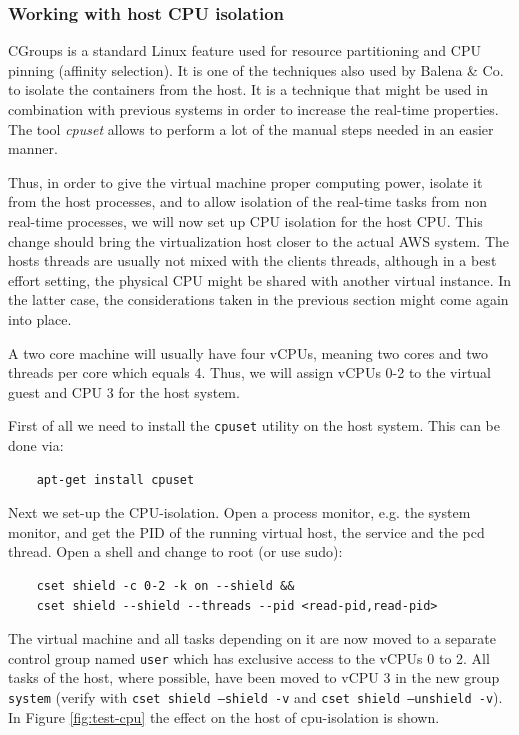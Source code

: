 \documentclass[]{scrartcl}
\begin{document}
\subsubsection{Working with host CPU isolation}

CGroups is a standard Linux feature used for resource partitioning and CPU pinning (affinity selection). It is one of the techniques also used by Balena \& Co. to isolate the containers from the host. It is a technique that might be used in combination with previous systems in order to increase the real-time properties. The tool \textit{cpuset} allows to perform a lot of the manual steps needed in an easier manner. 

Thus, in order to give the virtual machine proper computing power, isolate it from the host processes, and to allow isolation of the real-time tasks from non real-time processes, we will now set up CPU isolation for the host CPU.
This change should bring the virtualization host closer to the actual AWS system. The hosts threads are usually not mixed with the clients threads, although in a best effort setting, the physical CPU might be shared with another virtual instance. In the latter case, the considerations taken in the previous section might come again into place.

A two core machine will usually have four vCPUs, meaning two cores and two threads per core which equals 4. Thus, we will assign vCPUs 0-2 to the virtual guest and CPU 3 for the host system.

First of all we need to install the \texttt{cpuset} utility on the host system. This can be done via:

\begin{verbatim}
	apt-get install cpuset
\end{verbatim}

Next we set-up the CPU-isolation. Open a process monitor, e.g. the system monitor, and get the PID of the running virtual host, the service and the pcd thread. Open a shell and change to root (or use sudo):

\begin{verbatim}
	cset shield -c 0-2 -k on --shield &&
	cset shield --shield --threads --pid <read-pid,read-pid>
\end{verbatim}

The virtual machine and all tasks depending on it are now moved to a separate control group named \texttt{user} which has exclusive access to the vCPUs 0 to 2. All tasks of the host, where possible, have been moved to vCPU 3 in the new group \texttt{system} (verify with \texttt{cset shield --shield -v} and \texttt{cset shield --unshield -v}). In Figure \ref{fig:test-cpu} the effect on the host of cpu-isolation is shown.
\end{document}
